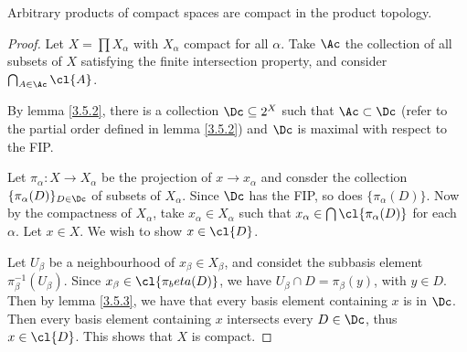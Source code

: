 \begin{theorem}\label{3.5.4}
    Arbitrary products of compact spaces are compact in the product topology.
\end{theorem}
\begin{proof}
    Let $X=\prod{X_\alpha}$ with $X_\alpha$ compact for all  $\alpha$. Take  $\Ac$ the collection of
    all subsets of  $X$ satisfying the finite intersection property, and consider  $\bigcap_{A \in
    \Ac}{\cl{A}}$.

    By lemma \ref{3.5.2}, there is a collection $\Dc \subseteq 2^X$ such that  $\Ac \subset \Dc$
    (refer to the partial order defined in lemma \ref{3.5.2}) and $\Dc$ is maximal with respect to
    the FIP.

    Let  $\pi_\alpha:X \rightarrow X_\alpha$ be the projection of $x \rightarrow x_\alpha$ and
    consder the collection $\{\pi_\alpha(D)\}_{D \in \Dc}$ of subsets of $X_\alpha$. Since  $\Dc$
    has the FIP,  so does  $\{\pi_\alpha(D)\}$. Now by the compactness of  $X_\alpha$, take
    $x_\alpha \in X_\alpha$ such that  $x_\alpha \in \bigcap{\cl{\pi_\alpha(D)}}$ for each $\alpha$.
    Let  $x \in X$. We wish to show  $x \in \cl{D}$.

    Let $U_\beta$ be a neighbourhood of  $x_\beta \in X_\beta$, and considet the subbasis element
    $\pi^{-1}_\beta(U_\beta)$. Since $x_\beta \in \cl{\pi_beta(D)}$, we have $U_\beta \cap
    D=\pi_\beta(y)$, with $y \in D$. Then by lemma \ref{3.5.3}, we have that every basis element
    containing $x$ is in  $\Dc$. Then every basis element containing  $x$ intersects every $D \in
    \Dc$, thus  $x \in \cl{D}$. This shows that $X$ is compact.
\end{proof}
